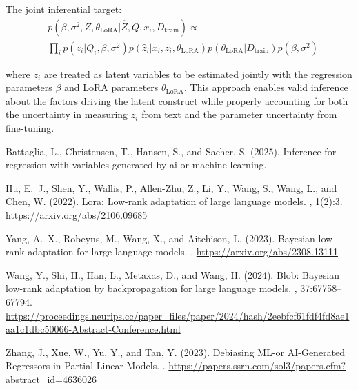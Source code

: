 \documentclass[11pt]{article}
\begin{document}
The joint inferential target:
\begin{align}
&p(\beta, \sigma^2, Z, \theta_{\text{LoRA}}|\hat{Z}, Q, x_i, D_{\text{train}}) \propto \label{eq:joint_target2} \\
&\prod_i p(z_i|Q_i, \beta, \sigma^2)p(\hat{z}_i|x_i, z_i, \theta_{\text{LoRA}})p(\theta_{\text{LoRA}}|D_{\text{train}})p(\beta, \sigma^2) \nonumber
\end{align}

where $z_i$ are treated as latent variables to be estimated jointly with the regression parameters $\beta$ and LoRA parameters $\theta_{\text{LoRA}}$. This approach enables valid inference about the factors driving the latent construct while properly accounting for both the uncertainty in measuring $z_i$ from text and the parameter uncertainty from fine-tuning.

\newpage

\begin{thebibliography}{99}

Battaglia, L., Christensen, T., Hansen, S., and Sacher, S. (2025).
\newblock Inference for regression with variables generated by ai or machine learning.

Hu, E.~J., Shen, Y., Wallis, P., Allen-Zhu, Z., Li, Y., Wang, S., Wang, L., and Chen, W. (2022).
\newblock Lora: Low-rank adaptation of large language models.
, 1(2):3.
\newblock \url{https://arxiv.org/abs/2106.09685}

Yang, A.~X., Robeyns, M., Wang, X., and Aitchison, L. (2023).
\newblock Bayesian low-rank adaptation for large language models.
.
\newblock \url{https://arxiv.org/abs/2308.13111}

Wang, Y., Shi, H., Han, L., Metaxas, D., and Wang, H. (2024).
\newblock Blob: Bayesian low-rank adaptation by backpropagation for large language models.
, 37:67758--67794.
\newblock \url{https://proceedings.neurips.cc/paper_files/paper/2024/hash/2eebfcf61fdf4fd8ae1aa1c1dbc50066-Abstract-Conference.html}

Zhang, J., Xue, W., Yu, Y., and Tan, Y. (2023).
\newblock Debiasing ML-or AI-Generated Regressors in Partial Linear Models.
.
\newblock \url{https://papers.ssrn.com/sol3/papers.cfm?abstract_id=4636026}

\end{thebibliography}
\end{document}
